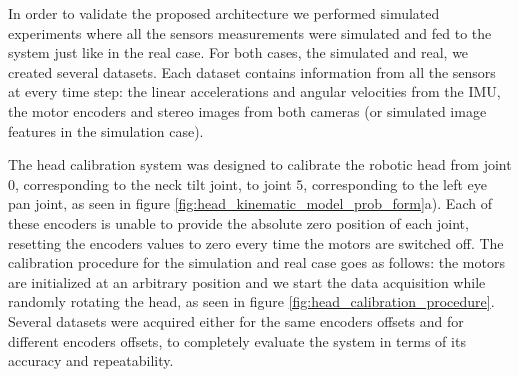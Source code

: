 In order to validate the proposed architecture we performed simulated experiments where all the sensors measurements were simulated and fed to the system just like in the real case. For both cases, the simulated and real, we created several datasets. Each dataset contains information from all the sensors at every time step: the linear accelerations and angular velocities from the IMU, the motor encoders and stereo images from both cameras (or simulated image features in the simulation case).

The head calibration system was designed to calibrate the robotic head from joint $0$, corresponding to the neck tilt joint, to joint $5$, corresponding to the left eye pan joint, as seen in figure \ref{fig:head_kinematic_model_prob_form}a). Each of these encoders is unable to provide the absolute zero position of each joint, resetting the encoders values to zero every time the motors are switched off. The calibration procedure for the simulation and real case goes as follows: the motors are initialized at an arbitrary position and we start the data acquisition while randomly rotating the head, as seen in figure \ref{fig:head_calibration_procedure}. Several datasets were acquired either for the same encoders offsets and for different encoders offsets, to completely evaluate the system in terms of its accuracy and repeatability.


